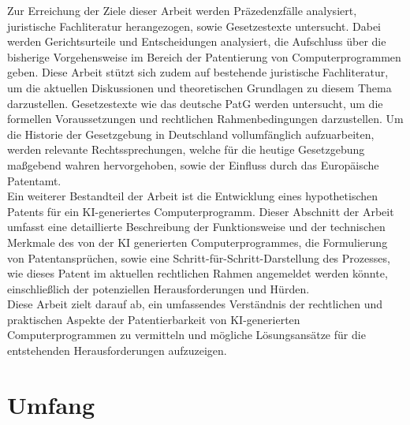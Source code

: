 Zur Erreichung der Ziele dieser Arbeit werden Präzedenzfälle analysiert, 
juristische Fachliteratur herangezogen, sowie Gesetzestexte untersucht. 
Dabei werden Gerichtsurteile und Entscheidungen analysiert, 
die Aufschluss über die bisherige Vorgehensweise 
im Bereich der Patentierung von Computerprogrammen geben. 
Diese Arbeit stützt sich zudem auf bestehende juristische Fachliteratur, 
um die aktuellen Diskussionen 
und theoretischen Grundlagen zu diesem Thema darzustellen.
Gesetzestexte wie das deutsche PatG werden untersucht, 
um die formellen Voraussetzungen und rechtlichen Rahmenbedingungen darzustellen. 
Um die Historie der Gesetzgebung in Deutschland vollumfänglich aufzuarbeiten,
werden relevante Rechtssprechungen, welche für die heutige Gesetzgebung
maßgebend wahren hervorgehoben, sowie der Einfluss durch das Europäische
Patentamt.
\\
Ein weiterer Bestandteil der Arbeit ist die Entwicklung eines hypothetischen Patents 
für ein KI-generiertes Computerprogramm. 
Dieser Abschnitt der Arbeit umfasst eine detaillierte Beschreibung der Funktionsweise 
und der technischen Merkmale des von der KI generierten Computerprogrammes, 
die Formulierung von Patentansprüchen, 
sowie eine Schritt-für-Schritt-Darstellung des Prozesses, 
wie dieses Patent im aktuellen rechtlichen Rahmen angemeldet werden könnte, 
einschließlich der potenziellen Herausforderungen und Hürden. 
\\
Diese Arbeit zielt darauf ab, 
ein umfassendes Verständnis der rechtlichen 
und praktischen Aspekte der 
Patentierbarkeit von KI-generierten Computerprogrammen zu vermitteln 
und mögliche Lösungsansätze für die entstehenden
Herausforderungen aufzuzeigen. 


\section{Umfang\label{sec:scope}}

